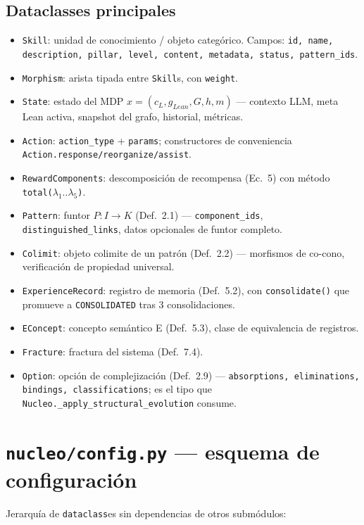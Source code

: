 \documentclass[11pt,a4paper]{report}
\newcommand{\code}[1]{\texttt{#1}}
\begin{document}
\subsection{Dataclasses principales}
\begin{itemize}
  \item \code{Skill}: unidad de conocimiento / objeto categ\'orico. Campos: \code{id, name, description, pillar, level, content, metadata, status, pattern_ids}.
  \item \code{Morphism}: arista tipada entre \code{Skill}s, con \code{weight}.
  \item \code{State}: estado del MDP $x=(c_L, g_{Lean}, G, h, m)$ --- contexto LLM, meta Lean activa, snapshot del grafo, historial, m\'etricas.
  \item \code{Action}: \code{action_type} + \code{params}; constructores de conveniencia \code{Action.response/reorganize/assist}.
  \item \code{RewardComponents}: descomposici\'on de recompensa (Ec.~5) con m\'etodo \code{total(}$\lambda_1..\lambda_5$\code{)}.
  \item \code{Pattern}: funtor $P: I \to K$ (Def.~2.1) --- \code{component_ids}, \code{distinguished_links}, datos opcionales de funtor completo.
  \item \code{Colimit}: objeto colimite de un patr\'on (Def.~2.2) --- morfismos de co-cono, verificaci\'on de propiedad universal.
  \item \code{ExperienceRecord}: registro de memoria (Def.~5.2), con \code{consolidate()} que promueve a \code{CONSOLIDATED} tras 3 consolidaciones.
  \item \code{EConcept}: concepto sem\'antico E (Def.~5.3), clase de equivalencia de registros.
  \item \code{Fracture}: fractura del sistema (Def.~7.4).
  \item \code{Option}: opci\'on de complejizaci\'on (Def.~2.9) --- \code{absorptions, eliminations, bindings, classifications}; es el tipo que \code{Nucleo._apply_structural_evolution} consume.
\end{itemize}

\section{\code{nucleo/config.py} --- esquema de configuraci\'on}

Jerarqu\'ia de \code{dataclass}es sin dependencias de otros subm\'odulos:
\end{document}
